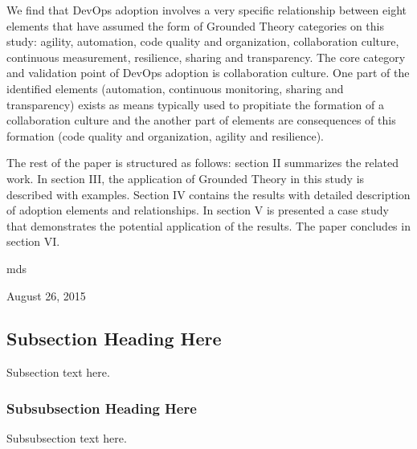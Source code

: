 We find that DevOps adoption involves a very specific relationship between
eight elements that have assumed the form of Grounded Theory categories on
this study: agility, automation, code quality and organization, collaboration
culture, continuous measurement, resilience, sharing and transparency. The
core category and validation point of DevOps adoption is collaboration culture.
One part of the identified elements (automation, continuous monitoring, sharing
and transparency) exists as means typically used to propitiate the formation
of a collaboration culture and the another part of elements are consequences
of this formation (code quality and organization, agility and resilience).

The rest of the paper is structured as follows: section II summarizes the
related work. In section III, the application of Grounded Theory in this study
is described with examples. Section IV contains the results with detailed
description of adoption elements and relationships. In section V is presented
a case study that demonstrates the potential application of the results. The
paper concludes in section VI.

\hfill mds

\hfill August 26, 2015

\subsection{Subsection Heading Here}
Subsection text here.

\subsubsection{Subsubsection Heading Here}
Subsubsection text here.
